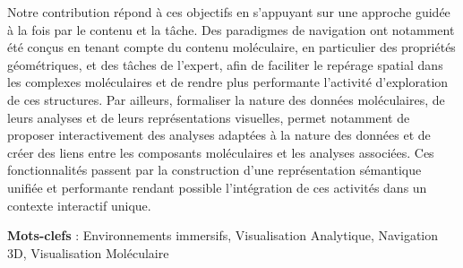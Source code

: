 Notre contribution répond à ces objectifs en s'appuyant sur une approche guidée à la fois par le contenu et la tâche. Des paradigmes de navigation ont notamment été conçus en tenant compte du contenu moléculaire, en particulier des propriétés géométriques, et des tâches de l'expert, afin de faciliter le repérage spatial dans les complexes moléculaires et de rendre plus performante l'activité d'exploration de ces structures. Par ailleurs, formaliser la nature des données moléculaires, de leurs analyses et de leurs représentations visuelles, permet notamment de proposer interactivement des analyses adaptées à la nature des données et de créer des liens entre les composants moléculaires et les analyses associées. Ces fonctionnalités passent par la construction d'une représentation sémantique unifiée et performante rendant possible l'intégration de ces activités dans un contexte interactif unique. 


\textbf{Mots-clefs} : Environnements immersifs, Visualisation Analytique, Navigation 3D, Visualisation Moléculaire


